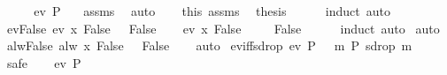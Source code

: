 \begin{isabellebody}
%
\isadelimproof
%
\endisadelimproof
%
\isatagproof
{}\isamarkupfalse%
\ {\isacharminus}\isanewline
\ \ \isamarkupfalse%
\ {\isachardoublequoteopen}ev\ P\ {\isasymomega}{\isachardoublequoteclose}\ \isamarkupfalse%
\ assms\ \isamarkupfalse%
\ auto\isanewline
\ \ \isamarkupfalse%
\ this\ assms\ \isamarkupfalse%
\ {\isacharquery}thesis\isanewline
\ \ \ \ \isamarkupfalse%
\ induct\ auto\isanewline
{}\isamarkupfalse%
%
\endisatagproof
{\isafoldproof}%
%
\isadelimproof
\isanewline
%
\endisadelimproof
\isanewline
{}\isamarkupfalse%
\ ev{\isacharunderscore}False{\isacharcolon}\ {\isachardoublequoteopen}ev\ {\isacharparenleft}{\isasymlambda}x{\isachardot}\ False{\isacharparenright}\ {\isasymomega}\ {\isasymlongleftrightarrow}\ False{\isachardoublequoteclose}\isanewline
%
\isadelimproof
%
\endisadelimproof
%
\isatagproof
{}\isamarkupfalse%
\isanewline
\ \ \isamarkupfalse%
\ {\isachardoublequoteopen}ev\ {\isacharparenleft}{\isasymlambda}x{\isachardot}\ False{\isacharparenright}\ {\isasymomega}{\isachardoublequoteclose}\ \isamarkupfalse%
\ \isamarkupfalse%
\ False\isanewline
\ \ \ \ \isamarkupfalse%
\ induct\ auto\isanewline
{}\isamarkupfalse%
\ auto%
\endisatagproof
{\isafoldproof}%
%
\isadelimproof
\isanewline
%
\endisadelimproof
\isanewline
{}\isamarkupfalse%
\ alw{\isacharunderscore}False{\isacharcolon}\ {\isachardoublequoteopen}alw\ {\isacharparenleft}{\isasymlambda}x{\isachardot}\ False{\isacharparenright}\ {\isasymomega}\ {\isasymlongleftrightarrow}\ False{\isachardoublequoteclose}\isanewline
%
\isadelimproof
\ \ %
\endisadelimproof
%
\isatagproof
{}\isamarkupfalse%
\ auto%
\endisatagproof
{\isafoldproof}%
%
\isadelimproof
\isanewline
%
\endisadelimproof
\isanewline
{}\isamarkupfalse%
\ ev{\isacharunderscore}iff{\isacharunderscore}sdrop{\isacharcolon}\ {\isachardoublequoteopen}ev\ P\ {\isasymomega}\ {\isasymlongleftrightarrow}\ {\isacharparenleft}{\isasymexists}m{\isachardot}\ P\ {\isacharparenleft}sdrop\ m\ {\isasymomega}{\isacharparenright}{\isacharparenright}{\isachardoublequoteclose}\isanewline
%
\isadelimproof
%
\endisadelimproof
%
\isatagproof
{}\isamarkupfalse%
\ safe\isanewline
\ \ \isamarkupfalse%
\ {\isachardoublequoteopen}ev\ P\ {\isasymomega}{\isachardoublequoteclose}\ \isamarkupfalse%
\ \isamarkupfalse%

\end{isabellebody}
